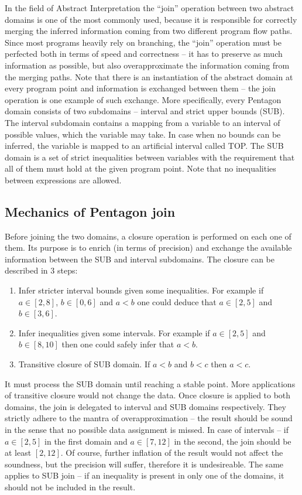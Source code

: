 \documentclass[letterpaper]{article}
\begin{document}
In the field of Abstract Interpretation the ``join'' operation between two abstract 
domains is one of the most commonly used, because it is responsible for correctly 
merging the inferred information coming from two different program flow paths. 
Since most programs heavily rely on branching, the ``join'' operation must be perfected 
both in terms of speed and correctness – it has to preserve as much information as possible, 
but also overapproximate the information coming from the merging paths. 
Note that there is an instantiation of the abstract domain at every program point 
and information is exchanged between them – the join operation is one example of 
such exchange. More specifically, every Pentagon domain \cite{Logozzo2008} consists of two 
subdomains – interval and strict upper bounds (SUB). The interval subdomain 
contains a mapping from a variable to an interval of possible values, which 
the variable may take. In case when no bounds can be inferred, the variable 
is mapped to an artificial interval called TOP. The SUB domain is a set of 
strict inequalities between variables with the requirement that all of them 
must hold at the given program point. Note that no inequalities between expressions are allowed.

\subsection{Mechanics of Pentagon join}
Before joining the two domains, a closure operation is performed on each one of them. 
Its purpose is to enrich (in terms of precision) and exchange the available 
information between the SUB and interval subdomains. The closure can be described in 3 steps:
\begin{enumerate}
\item Infer stricter interval bounds given some inequalities. 
For example if \(a \in [2,8]\), \(b \in [0,6]\) and \(a < b\) one could deduce that \(a \in [2,5]\) and \(b \in [3,6]\).
\item Infer inequalities given some intervals. 
For example if \(a \in [2,5]\) and \(b \in [8,10]\) then one could safely infer that \(a < b\).
\item Transitive closure of SUB domain. If \(a < b\) and \(b < c\) then \(a < c\).
\end{enumerate}
It must process the SUB domain until reaching a stable point. More applications of transitive closure would not change the data.
Once closure is applied to both domains, the join is delegated to interval and SUB domains respectively. 
They strictly adhere to the mantra of overapproximation -- the result should be sound in the 
sense that no possible data assignment is missed. In case of intervals -- if \(a \in [2,5]\) in 
the first domain and \(a \in [7,12]\) in the second, the join should be at least \([2,12]\). 
Of course, further inflation of the result would not affect the soundness, but 
the precision will suffer, therefore it is undesireable. 
The same applies to SUB join -- if an inequality is present in only one of the domains, it should not be included in the result.
\end{document}
